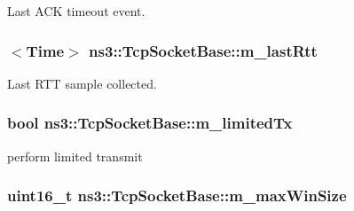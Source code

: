 Last A\+CK timeout event. 

\subsubsection[{\texorpdfstring{m\+\_\+last\+Rtt}{m_lastRtt}}]{$<${\bf Time}$>$ ns3\+::\+Tcp\+Socket\+Base\+::m\+\_\+last\+Rtt\hspace{0.3cm}{\ttfamily [protected]}}\hypertarget{classns3_1_1TcpSocketBase_a6c48fbea019c593b975bd1d5f5c95dde}{}\label{classns3_1_1TcpSocketBase_a6c48fbea019c593b975bd1d5f5c95dde}


Last R\+TT sample collected. 

\subsubsection[{\texorpdfstring{m\+\_\+limited\+Tx}{m_limitedTx}}]{\setlength{\rightskip}{0pt plus 5cm}bool ns3\+::\+Tcp\+Socket\+Base\+::m\+\_\+limited\+Tx\hspace{0.3cm}{\ttfamily [protected]}}\hypertarget{classns3_1_1TcpSocketBase_a676649ad67ed68ec06a1a87a6acd6693}{}\label{classns3_1_1TcpSocketBase_a676649ad67ed68ec06a1a87a6acd6693}


perform limited transmit 

\subsubsection[{\texorpdfstring{m\+\_\+max\+Win\+Size}{m_maxWinSize}}]{\setlength{\rightskip}{0pt plus 5cm}uint16\+\_\+t ns3\+::\+Tcp\+Socket\+Base\+::m\+\_\+max\+Win\+Size\hspace{0.3cm}{\ttfamily [protected]}}\hypertarget{classns3_1_1TcpSocketBase_a045897aa710b2ad3e99cefd66e8dc168}{}\label{classns3_1_1TcpSocketBase_a045897aa710b2ad3e99cefd66e8dc168}


